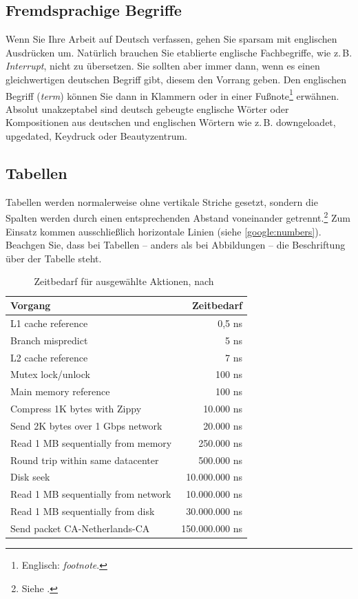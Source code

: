 \documentclass[conference,compsoc,final,a4paper]{IEEEtran}
\begin{document}
\subsection{Fremdsprachige Begriffe}
Wenn Sie Ihre Arbeit auf Deutsch verfassen, gehen Sie sparsam mit englischen Ausdrücken um. Natürlich brauchen Sie etablierte englische Fachbegriffe, wie z.\,B. \textit{Interrupt}, nicht zu übersetzen. Sie sollten aber immer dann, wenn es einen gleichwertigen deutschen Begriff gibt, diesem den Vorrang geben. Den englischen Begriff (\textit{term}) können Sie dann in Klammern oder in einer Fußnote\footnote{Englisch: \textit{footnote}.} erwähnen. Absolut unakzeptabel sind deutsch gebeugte englische Wörter oder Kompositionen aus deutschen und englischen Wörtern wie z.\,B. downgeloadet, upgedated, Keydruck oder Beautyzentrum.

\subsection{Tabellen}
Tabellen werden normalerweise ohne vertikale Striche gesetzt, sondern die Spalten werden durch einen entsprechenden Abstand voneinander getrennt.\footnote{Siehe \cite[S. 89]{Willberg1999}.} Zum Einsatz kommen ausschließlich horizontale Linien (siehe \autoref{google:numbers}). Beachgen Sie, dass bei Tabellen -- anders als bei Abbildungen -- die Beschriftung über der Tabelle steht.

\begin{table}[!ht]
\centering
\rmfamily
\caption{Zeitbedarf für ausgewählte Aktionen, nach~\cite{Dean2012}}
\renewcommand{\arraystretch}{1.1}
\sffamily
\begin{footnotesize}
\begin{tabular}{l r}
\toprule
\textbf{Vorgang} & \textbf{Zeitbedarf} \\
\midrule
L1 cache reference                  & 0,5 ns\\
Branch mispredict                   & 5 ns\\
L2 cache reference                  & 7 ns\\
Mutex lock/unlock                   & 100 ns\\
Main memory reference               & 100 ns\\
Compress 1K bytes with Zippy        & 10.000 ns\\
Send 2K bytes over 1 Gbps network   & 20.000 ns\\
Read 1 MB sequentially from memory  & 250.000 ns\\
Round trip within same datacenter   & 500.000 ns\\
Disk seek                           & 10.000.000 ns\\
Read 1 MB sequentially from network & 10.000.000 ns\\
Read 1 MB sequentially from disk    & 30.000.000 ns\\
Send packet CA-Netherlands-CA       & 150.000.000 ns\\
\bottomrule
\end{tabular}
\end{footnotesize}
\label{google:numbers}
\end{table}
\end{document}
